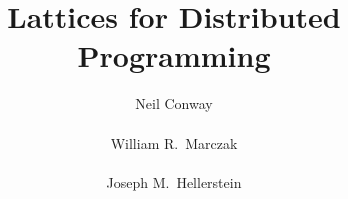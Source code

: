 \documentclass{vldb}
\begin{document}
\title{Lattices for Distributed Programming}


\author{
\alignauthor
Neil Conway\\
       \\
\alignauthor
William R.\ Marczak\\
       \\
\alignauthor
Joseph M.\ Hellerstein\\
       \\
}

\maketitle

\begin{abstract}
\end{abstract}











\end{document}
